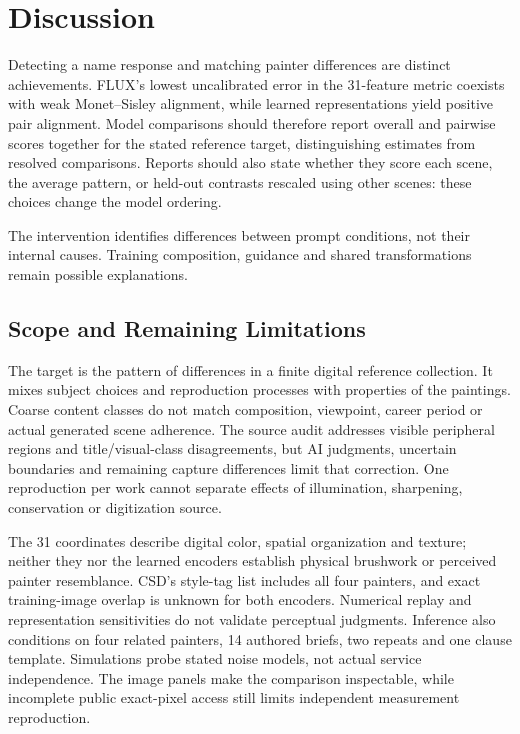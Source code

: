 \section{Discussion}\label{sec:discussion}
Detecting a name response and matching painter differences are distinct achievements.
FLUX's lowest uncalibrated error in the 31-feature metric coexists with weak
Monet--Sisley alignment, while learned representations yield positive pair alignment.
Model comparisons should therefore report overall and pairwise scores together
for the stated reference target, distinguishing estimates from resolved comparisons.
Reports should also state whether they score each scene, the average pattern,
or held-out contrasts rescaled using other scenes: these choices change the model ordering.

The intervention identifies differences between prompt conditions, not their
internal causes. Training composition, guidance and shared transformations remain
possible explanations.

\subsection{Scope and Remaining Limitations}
The target is the pattern of differences in a finite digital reference
collection. It mixes subject choices and reproduction processes with properties
of the paintings. Coarse content classes do not match composition, viewpoint,
career period or actual generated scene adherence. The source audit addresses
visible peripheral regions and title/visual-class disagreements, but AI
judgments, uncertain boundaries and remaining capture differences limit that
correction. One reproduction per work cannot separate effects of illumination,
sharpening, conservation or digitization source.

The 31 coordinates describe digital color, spatial organization and texture;
neither they nor the learned encoders establish physical brushwork or perceived
painter resemblance. CSD's style-tag list includes all four painters, and exact
training-image overlap is unknown for both encoders. Numerical replay and
representation sensitivities do not validate perceptual judgments.
Inference also conditions on four related
painters, 14 authored briefs, two repeats and one clause template. Simulations
probe stated noise models, not actual service independence. The image panels
make the comparison inspectable, while incomplete public exact-pixel access
still limits independent measurement reproduction.


